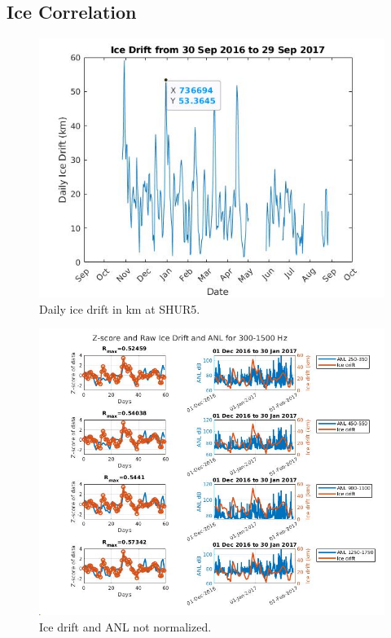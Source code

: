 \subsection{Ice Correlation} %

\begin{figure}[h]
\centering
\includegraphics[scale=0.5]{Figures/sep2016_sep2017_drift.jpg}
\caption{Daily ice drift in km at SHUR5.}
\label{fig_dailyice}
\end{figure}

\begin{figure}[h]
\centering
\includegraphics[scale=0.5]{Figures/broadband_zscore_raw.jpg}
\caption{Ice drift and ANL not normalized.}
\label{fig_broad_ice}
\end{figure}


